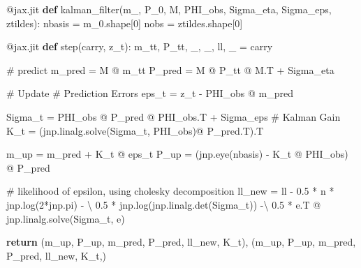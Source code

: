 \documentclass[
]{report}
\newenvironment{Shaded}{\begin{snugshade}}{\end{snugshade}}
\newcommand{\AttributeTok}[1]{\textcolor[rgb]{0.40,0.45,0.13}{#1}}
\newcommand{\CommentTok}[1]{\textcolor[rgb]{0.37,0.37,0.37}{#1}}
\newcommand{\ControlFlowTok}[1]{\textcolor[rgb]{0.00,0.23,0.31}{\textbf{#1}}}
\newcommand{\DecValTok}[1]{\textcolor[rgb]{0.68,0.00,0.00}{#1}}
\newcommand{\FloatTok}[1]{\textcolor[rgb]{0.68,0.00,0.00}{#1}}
\newcommand{\KeywordTok}[1]{\textcolor[rgb]{0.00,0.23,0.31}{\textbf{#1}}}
\newcommand{\NormalTok}[1]{\textcolor[rgb]{0.00,0.23,0.31}{#1}}
\newcommand{\OperatorTok}[1]{\textcolor[rgb]{0.37,0.37,0.37}{#1}}
\theoremstyle{plain}
\theoremstyle{plain}
\theoremstyle{remark}
\begin{document}
\begin{Shaded}
\begin{Highlighting}[]
\AttributeTok{@jax.jit}
\KeywordTok{def}\NormalTok{ kalman\_filter(m\_, P\_0, M, PHI\_obs, Sigma\_eta, Sigma\_eps, ztildes):}
\NormalTok{    nbasis }\OperatorTok{=}\NormalTok{ m\_0.shape[}\DecValTok{0}\NormalTok{]}
\NormalTok{    nobs }\OperatorTok{=}\NormalTok{ ztildes.shape[}\DecValTok{0}\NormalTok{]}

    \AttributeTok{@jax.jit}
    \KeywordTok{def}\NormalTok{ step(carry, z\_t):}
\NormalTok{        m\_tt, P\_tt, \_, \_, ll, \_ }\OperatorTok{=}\NormalTok{ carry}

        \CommentTok{\# predict}
\NormalTok{        m\_pred }\OperatorTok{=}\NormalTok{ M }\OperatorTok{@}\NormalTok{ m\_tt}
\NormalTok{        P\_pred }\OperatorTok{=}\NormalTok{ M }\OperatorTok{@}\NormalTok{ P\_tt }\OperatorTok{@}\NormalTok{ M.T }\OperatorTok{+}\NormalTok{ Sigma\_eta}

        \CommentTok{\# Update}
        \CommentTok{\# Prediction Errors}
\NormalTok{        eps\_t }\OperatorTok{=}\NormalTok{ z\_t }\OperatorTok{{-}}\NormalTok{ PHI\_obs }\OperatorTok{@}\NormalTok{ m\_pred}

\NormalTok{        Sigma\_t }\OperatorTok{=}\NormalTok{ PHI\_obs }\OperatorTok{@}\NormalTok{ P\_pred }\OperatorTok{@}\NormalTok{ PHI\_obs.T }\OperatorTok{+}\NormalTok{ Sigma\_eps}
        \CommentTok{\# Kalman Gain}
\NormalTok{        K\_t }\OperatorTok{=}\NormalTok{ (jnp.linalg.solve(Sigma\_t, PHI\_obs)}\OperatorTok{@}\NormalTok{ P\_pred.T).T}

\NormalTok{        m\_up }\OperatorTok{=}\NormalTok{ m\_pred }\OperatorTok{+}\NormalTok{ K\_t }\OperatorTok{@}\NormalTok{ eps\_t}
\NormalTok{        P\_up }\OperatorTok{=}\NormalTok{ (jnp.eye(nbasis) }\OperatorTok{{-}}\NormalTok{ K\_t }\OperatorTok{@}\NormalTok{ PHI\_obs) }\OperatorTok{@}\NormalTok{ P\_pred}

        \CommentTok{\# likelihood of epsilon, using cholesky decomposition}
\NormalTok{        ll\_new }\OperatorTok{=}\NormalTok{ ll }\OperatorTok{{-}} \FloatTok{0.5} \OperatorTok{*}\NormalTok{ n }\OperatorTok{*}\NormalTok{ jnp.log(}\DecValTok{2}\OperatorTok{*}\NormalTok{jnp.pi) }\OperatorTok{{-}} \OperatorTok{\textbackslash{}}
            \FloatTok{0.5} \OperatorTok{*}\NormalTok{ jnp.log(jnp.linalg.det(Sigma\_t)) }\OperatorTok{{-}\textbackslash{}}
            \FloatTok{0.5} \OperatorTok{*}\NormalTok{ e.T }\OperatorTok{@}\NormalTok{ jnp.linalg.solve(Sigma\_t, e)}

        \ControlFlowTok{return}\NormalTok{ (m\_up, P\_up, m\_pred, P\_pred, ll\_new, K\_t), (m\_up, P\_up, m\_pred, P\_pred, ll\_new, K\_t,)}


\end{Highlighting}
\end{Shaded}
\end{document}

